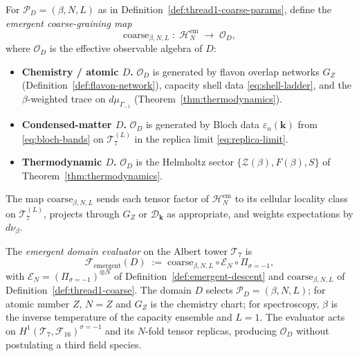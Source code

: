 \begin{definition}
\label{def:thread1-coarse}
For $\mathcal{P}_D=(\beta,N,L)$ as in Definition~\ref{def:thread1-coarse-params},
define the \emph{emergent coarse-graining map}
\begin{equation}\label{eq:thread1-coarse}
  \mathrm{coarse}_{\beta,N,L}
  \;:\;
  \mathcal{H}_N^{\mathrm{em}}
  \;\longrightarrow\;
  \mathcal{O}_D,
\end{equation}
where $\mathcal{O}_D$ is the effective observable algebra of $D$:
\begin{itemize}[leftmargin=*]
  \item \textbf{Chemistry / atomic $D$.}
    $\mathcal{O}_D$ is generated by flavon overlap networks $G_Z$
    (Definition~\ref{def:flavon-network}), capacity shell data
    \eqref{eq:shell-ladder}, and the $\beta$-weighted trace on
    $d\mu_{\Gamma_{-1}}$ (Theorem~\ref{thm:thermodynamics}).
  \item \textbf{Condensed-matter $D$.}
    $\mathcal{O}_D$ is generated by Bloch data $\varepsilon_n(\mathbf{k})$
    from \eqref{eq:bloch-bands} on $\mathcal{T}_7^{(L)}$ in the replica limit
    \eqref{eq:replica-limit}.
  \item \textbf{Thermodynamic $D$.}
    $\mathcal{O}_D$ is the Helmholtz sector
    $\{\mathcal{Z}(\beta),F(\beta),S\}$ of Theorem~\ref{thm:thermodynamics}.
\end{itemize}
The map $\mathrm{coarse}_{\beta,N,L}$ sends each tensor factor of
$\mathcal{H}_N^{\mathrm{em}}$ to its cellular locality class on
$\mathcal{T}_7^{(L)}$, projects through $G_Z$ or $\mathcal{D}_{\mathbf{k}}$
as appropriate, and weights expectations by $d\nu_\beta$.
\end{definition}

\begin{definition}\label{def:thread-1-evaluator}
The \emph{emergent domain evaluator} on the Albert tower $\mathcal{T}_7$ is
\begin{equation}\label{eq:thread1-evaluator}
  \mathcal{F}_{\mathrm{emergent}}(D)
  \;:=\;
  \mathrm{coarse}_{\beta,N,L}
  \circ
  \mathcal{E}_N
  \circ
  \Pi_{\sigma=-1},
\end{equation}
with $\mathcal{E}_N=(\Pi_{\sigma=-1})^{\otimes N}$ of
Definition~\ref{def:emergent-descent} and
$\mathrm{coarse}_{\beta,N,L}$ of Definition~\ref{def:thread1-coarse}.
The domain $D$ selects $\mathcal{P}_D=(\beta,N,L)$; for atomic number $Z$,
$N=Z$ and $G_Z$ is the chemistry chart; for spectroscopy,
$\beta$ is the inverse temperature of the capacity ensemble and $L=1$.
The evaluator acts on
$H^1(\mathcal{T}_7,\mathcal{F}_{16})^{\sigma=-1}$ and its $N$-fold tensor
replicas, producing $\mathcal{O}_D$ without postulating a third field species.
\end{definition}

